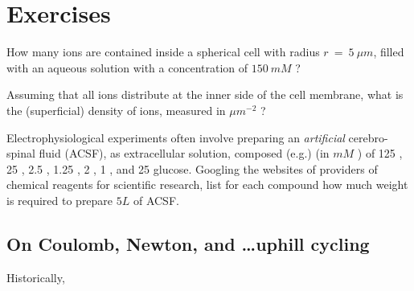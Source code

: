 \section*{Exercises}
\begin{prob} \label{problem:concentrations1}
	How many  ions are contained inside a spherical cell with radius \( r\ =\ 5\ \mu m \), filled with an aqueous solution with a concentration of \( 150\ mM \)  ?
\end{prob}
\begin{prob} \label{problem:concentrations2}
	Assuming that all  ions distribute at the inner side of the cell membrane, what is the (superficial) density of ions, measured in \( \mu m^{ -2} \) ?
\end{prob}
\begin{prob} \label{problem:concentrations3}
	Electrophysiological experiments often involve preparing an \textit{artificial} cerebro-spinal fluid (ACSF), as extracellular solution, composed (e.g.) (in \( mM \) ) of 125 , 25 , 2.5 , 1.25 , 2 , 1 , and 25 glucose. Googling the websites of providers of chemical reagents for scientific research, list for each compound how much weight is required to prepare \( 5 L \) of ACSF. 	
\end{prob}

\subsection{On Coulomb, Newton, and \ldots uphill cycling}

Historically,

